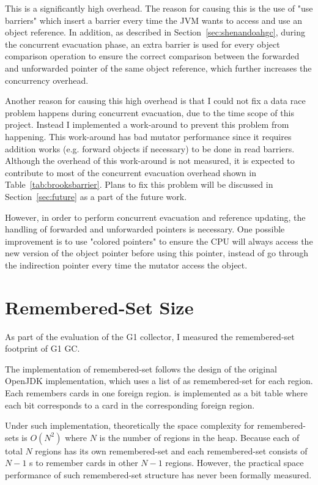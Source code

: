 This is a significantly high overhead. The reason for causing this is the use of 
"use barriers" which insert a barrier every time the JVM wants to access and use
an object reference. In addition, as described in Section~\ref{sec:shenandoahgc}, during the concurrent evacuation phase,
an extra barrier is used for every object comparison operation
to ensure the correct comparison between the forwarded and unforwarded pointer of the same object reference,
which further increases the concurrency overhead.

Another reason for causing this high overhead is that I could not fix a data race
problem happens during concurrent evacuation, due to the time scope of this project.
Instead I implemented a work-around to prevent this problem from happening.
This work-around has bad mutator performance since it requires addition
works (e.g. forward objects if necessary) to be done in read barriers.
Although the overhead of this work-around is not measured, it is expected to
contribute to most of the concurrent evacuation overhead shown in Table~\ref{tab:brooksbarrier}.
Plans to fix this problem will be discussed in Section~\ref{sec:future} as a part of the future work.

However, in order to perform concurrent evacuation and reference updating, the handling
of forwarded and unforwarded pointers is necessary.
One possible improvement is to use "colored pointers" to ensure the CPU will always access
the new version of the object pointer before using this pointer,
instead of go through the indirection pointer every time the mutator access the object.

\section{Remembered-Set Size} %
\label{sec:remsetsize}

As part of the evaluation of the G1 collector, I measured the remembered-set footprint
of G1 GC.

The implementation of remembered-set follows the design of the original OpenJDK
implementation, which uses a list of  as remembered-set
for each region. Each  remembers cards in one foreign region.
 is implemented as a bit table where each bit corresponds
to a card in the corresponding foreign region. 

Under such implementation, theoretically the space complexity for remembered-sets
is $O(N^2)$ where $N$ is the number of regions in the heap. Because each of total $N$ regions
has its own remembered-set and each remembered-set consists of $N-1$ s
to remember cards in other $N-1$ regions. However, the practical space performance
of such remembered-set structure has never been formally measured.

